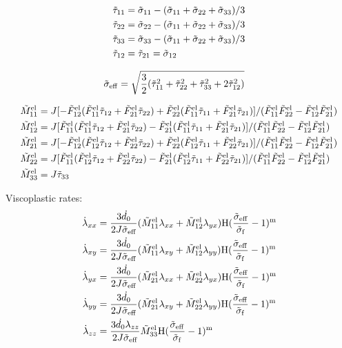 \documentclass[../main.tex]{subfiles}
\begin{document}
\begin{align}
    \ttau{11} &= \tsigma{11} - (\tsigma{11} + \tsigma{22} + \tsigma{33})/3 \\
    \ttau{22} &= \tsigma{22} - (\tsigma{11} + \tsigma{22} + \tsigma{33})/3 \\
    \ttau{33} &= \tsigma{33} - (\tsigma{11} + \tsigma{22} + \tsigma{33})/3 \\
    \ttau{12}  &= \ttau{21} = \tsigma{12}
\end{align}

\begin{align}
    \tsigmaeff &= \sqrt{\fc{3}{2}(\ttau{11}^2 + \ttau{22}^2 + \ttau{33}^2 + 2\ttau{12}^2) }
\end{align}


\begin{align}
    \tMel{11} &= J[-\tFel{12}(\tFel{11}\ttau{12} + \tFel{21}\ttau{22}) + \tFel{22}(\tFel{11}\ttau{11} + \tFel{21}\ttau{21})]/(\tFelMult{11}{22}-\tFelMult{12}{21})\\
    \tMel{12} &= J[\tFel{11}(\tFel{11}\ttau{12} + \tFel{21}\ttau{22}) - \tFel{21}(\tFel{11}\ttau{11} + \tFel{21}\ttau{21})]/(\tFelMult{11}{22}-\tFelMult{12}{21})\\
    \tMel{21} &= J[-\tFel{12}(\tFel{12}\ttau{12} + \tFel{22}\ttau{22}) + \tFel{22}(\tFel{12}\ttau{11} + \tFel{22}\ttau{21})]/(\tFelMult{11}{22}-\tFelMult{12}{21})\\
    \tMel{22} &= J[\tFel{11}(\tFel{12}\ttau{12} + \tFel{22}\ttau{22}) - \tFel{21}(\tFel{12}\ttau{11} + \tFel{22}\ttau{21})]/(\tFelMult{11}{22}-\tFelMult{12}{21})\\
    \tMel{33} &= J \ttau{33}
\end{align}

Viscoplastic rates: 
\begin{align}
    \dotlam{xx} &= \fc{3\dot{d_0}}{2 J \tsigmaeff}(\tMel{11} \lamxx + \tMel{12}\lamyx)\HS(\fc{\tsigmaeff}{\tsigmaf} - 1 )^\m\\
   \dotlam{xy} &= \fc{3\dot{d_0}}{2 J \tsigmaeff}(\tMel{11} \lamxy + \tMel{12}\lamyy)\HS(\fc{\tsigmaeff}{\tsigmaf} - 1 )^\m\\
   \dotlam{yx} &= \fc{3\dot{d_0}}{2 J \tsigmaeff}(\tMel{21} \lamxx + \tMel{22}\lamyx)\HS(\fc{\tsigmaeff}{\tsigmaf} - 1 )^\m\\
   \dotlam{yy} &= \fc{3\dot{d_0}}{2 J \tsigmaeff}(\tMel{21} \lamxy + \tMel{22}\lamyy)\HS(\fc{\tsigmaeff}{\tsigmaf} - 1 )^\m\\
    \dotlam{zz} &= \fc{3\dot{d_0}\lamzz}{2 J \tsigmaeff}\tMel{33}\HS(\fc{\tsigmaeff}{\tsigmaf} - 1 )^\m\\
\end{align}
\end{document}
